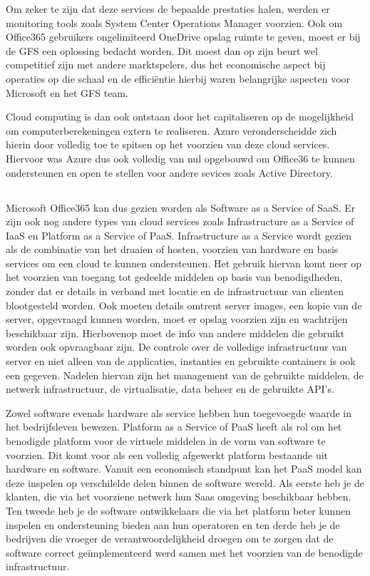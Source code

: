 Om zeker te zijn dat deze services de bepaalde prestaties halen, werden er monitoring tools zoals System Center Operations Manager voorzien. Ook om Office365 gebruikers ongelimiteerd OneDrive opslag ruimte te geven, moest er bij de GFS een oplossing bedacht worden. Dit moest dan op zijn beurt wel competitief zijn met andere marktspelers, dus het economische aspect bij operaties op die schaal en de efficiëntie hierbij waren belangrijke aspecten voor Microsoft en het GFS team.

Cloud computing is dan ook ontstaan door het capitaliseren op de mogelijkheid om computerberekeningen extern te realiseren. Azure veronderscheidde zich hierin door volledig toe te spitsen op het voorzien van deze cloud services. Hiervoor was Azure dus ook volledig van nul opgebouwd om Office36 te kunnen ondersteunen en open te stellen voor andere sevices zoals Active Directory.\autocite{Copeland2015}

\subsection{}%
\label{sec:IaaS, PaaS en SaaS}

Microsoft Office365 kan dus gezien worden als Software as a Service of SaaS. Er zijn ook nog andere types van cloud services zoals Infrastructure as a Service of IaaS en Platform as a Service of PaaS. Infrastructure as a Service wordt gezien als de combinatie van het draaien of hosten, voorzien van hardware en basis services om een cloud te kunnen ondersteunen.
Het gebruik hiervan komt neer op het voorzien van toegang tot gedeelde middelen op basis van benodigdheden, zonder dat er details in verband met locatie en de infrastructuur van clienten blootgesteld worden. Ook moeten details omtrent server images, een kopie van de server, opgevraagd kunnen worden, moet er opslag voorzien zijn en wachtrijen beschikbaar zijn. Hierbovenop moet de info van andere middelen die gebruikt worden ook opvraagbaar zijn.
De controle over de volledige infrastructuur van server en niet alleen van de applicaties, instanties en gebruikte containers is ook een gegeven. Nadelen hiervan zijn het management van de gebruikte middelen, de netwerk infrastructuur, de virtualisatie, data beheer en de gebruikte API's.\autocite{Manvi2014}

Zowel software evenals hardware als service hebben hun toegevoegde waarde in het bedrijfsleven bewezen. Platform as a Service of PaaS heeft als rol om het benodigde platform voor de virtuele middelen in de vorm van software te voorzien. Dit komt voor als een volledig afgewerkt platform bestaande uit hardware en software. Vanuit een economisch standpunt kan het PaaS model kan deze inspelen op verschilelde delen binnen de software wereld. Als eerste heb je de klanten, die via het voorziene netwerk hun Saas omgeving beschikbaar hebben. Ten tweede heb je de software ontwikkelaars die via het platform beter kunnen inspelen en ondersteuning bieden aan hun operatoren en ten derde heb je de bedrijven die vroeger de verantwoordelijkheid droegen om te zorgen dat de software correct geïmplementeerd werd samen met het voorzien van de benodigde infrastructuur.\autocite{Beimborn2011}

